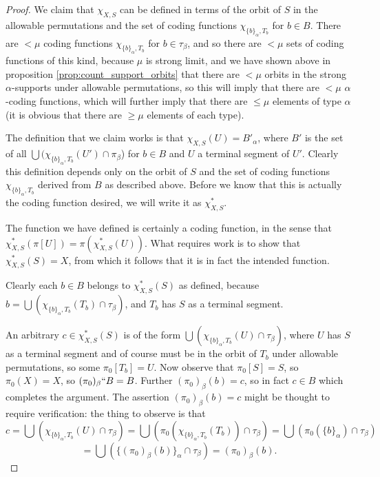 \documentclass[112pt]{article}
\theoremstyle{definition}
\theoremstyle{remark}
\newcommand{\rk}[1]{{\color{blue}\sl #1}}
\begin{document}
\begin{proof}
We claim that $\chi_{X,S}$ can be defined in terms of the orbit of $S$ in the allowable permutations and the set of coding functions $\chi_{\{b\}_\alpha,T_b}$ for $b \in B$.  There are $<\mu$ coding functions $\chi_{\{b\}_\alpha,T_b}$ for $b \in \tau_\beta$, and so there are $<\mu$ sets of coding functions of this kind, because $\mu$ is strong limit, and we have shown above in proposition \ref{prop:count_support_orbits} that there are $<\mu$ orbits in the strong $\alpha$-supports under allowable permutations, so this will imply that there are $<\mu$ $\alpha$-coding functions, which will further imply that there are $\leq \mu$ elements of type $\alpha$ (it is obvious that there are $\geq \mu$ elements of each type).


The definition that we claim works is that $\chi_{X,S}(U) = B'_\alpha$, where $B'$ is the set of all $\bigcup (\chi_{\{b\}_\alpha,T_b}(U')\cap \pi_\beta$) for $b \in B$ and $U$ a terminal segment of  $U'$.  Clearly this definition depends only on the orbit of $S$ and the set of coding functions $\chi_{\{b\}_\alpha,T_b}$ derived from $B$ as described above.  Before we know that this is actually the coding function desired, we will write it as $\chi_{X,S}^*$.

The function we have defined is certainly a coding function, in the sense that $\chi_{X,S}^*(\pi[U]) = \pi(\chi_{X,S}^*(U))$.  What requires work is to show that
$\chi_{X,S}^*(S)=X$, from which it follows that it is in fact the intended function.

Clearly each $b \in B$ belongs to $\chi^*_{X,S}(S)$ as defined, because \newline $b = \bigcup (\chi_{\{b\}_\alpha,T_b}(T_b)\cap \tau_{\beta})$, and $T_b$ has $S$ as a terminal segment.

An arbitrary $c \in \chi_{X,S}^*(S)$ is of the form $\bigcup (\chi_{\{b\}_\alpha,T_b}(U)\cap \tau_{\beta})$, where $U$ has $S$ as a terminal segment and of course must be in the orbit of $T_b$ under allowable permutations, so some $\pi_0[T_b] = U$. Now observe that $\pi_0[S]=S$, so $\pi_0(X)=X$, so
$(\pi_0)_\beta``B=B$.  Further $(\pi_0)_\beta(b) = c$, so in fact $c \in B$ which completes the argument.  The assertion $(\pi_0)_\beta(b) = c$ might be thought to require verification:   the thing to observe is that
$$c=\bigcup (\chi_{\{b\}_\alpha,T_b}(U) \cap \tau_\beta)=\bigcup(\pi_0(\chi_{\{b\}_\alpha,T_b}(T_b))\cap \tau_\beta)=
\bigcup (\pi_0(\{b\}_\alpha)\cap \tau_\beta) $$
$$=\bigcup(\{(\pi_0)_\beta(b)\}_{\alpha} \cap \tau_\beta) = (\pi_0)_\beta(b).$$


\end{proof}
\end{document}
